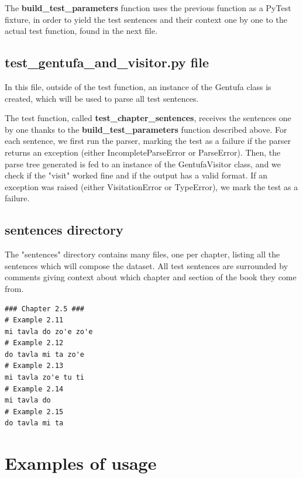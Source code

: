 The \textbf{build\_test\_parameters} function uses the previous function as a PyTest fixture, in order to yield the test sentences and
their context one by one to the actual test function, found in the next file.

\subsection*{test\_gentufa\_and\_visitor.py file}

In this file, outside of the test function, an instance of the Gentufa class is created, which will be used to parse all test sentences.\newline

The test function, called \textbf{test\_chapter\_sentences}, receives the sentences one by one thanks to the \textbf{build\_test\_parameters} function
described above. For each sentence, we first run the parser, marking the test as a failure if the parser returns an exception (either IncompleteParseError
or ParseError). Then, the parse tree generated is fed to an instance of the GentufaVisitor class, and we check if the "visit" worked fine and if the output
has a valid format. If an exception was raised (either VisitationError or TypeError), we mark the test as a failure.

\subsection*{sentences directory}

The "sentences" directory contains many files, one per chapter, listing all the sentences which will compose the dataset.
All test sentences are surrounded by comments giving context about which chapter and section of the book they come from.

\newpage

\begin{lstlisting}[caption=Example of a test file with some sentences to be parsed]
### Chapter 2.5 ###
# Example 2.11
mi tavla do zo'e zo'e
# Example 2.12
do tavla mi ta zo'e
# Example 2.13
mi tavla zo'e tu ti
# Example 2.14
mi tavla do
# Example 2.15
do tavla mi ta
\end{lstlisting}

\newpage

\section{Examples of usage}

